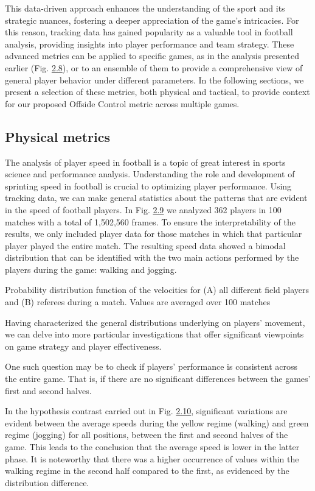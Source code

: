 \documentclass[twoside,nohyper]{tufte-book}
\begin{document}
This data-driven approach enhances the understanding of the sport and
its strategic nuances, fostering a deeper appreciation of the game's
intricacies. For this reason, tracking data has gained popularity as a
valuable tool in football analysis, providing insights into player
performance and team strategy. These advanced metrics can be applied to
specific games, as in the analysis presented earlier (Fig.
\protect\hyperlink{f2.8}{2.8}), or to an ensemble
of them to provide a comprehensive view of general player behavior under
different parameters. In the following sections, we present a selection
of these metrics, both physical and tactical, to provide context for our
proposed Offside Control metric across multiple games.

\hypertarget{physical-metrics-1}{%
\subsection{Physical metrics}\label{physical-metrics-1}}

The analysis of player speed in football is a topic of great interest in
sports science and performance analysis. Understanding the role and
development of sprinting speed in football is crucial to optimizing
player performance. Using tracking data, we can make general statistics
about the patterns that are evident in the speed of football players. In
Fig. \protect\hyperlink{f2.9}{2.9} we analyzed 362
players in 100 matches with a total of 1,502,560 frames. To ensure the
interpretability of the results, we only included player data for those
matches in which that particular player played the entire match. The
resulting speed data showed a bimodal distribution that can be
identified with the two main actions performed by the players during the
game: walking and jogging.

Probability distribution function of the velocities for
(A) all different field players and
(B) referees during a match. Values are averaged over
{100} matches

Having characterized the general distributions underlying on players'
movement, we can delve into more particular investigations that offer
significant viewpoints on game strategy and player effectiveness.

One such question may be to check if players' performance is consistent
across the entire game. That is, if there are no significant differences
between the games' first and second halves.

In the hypothesis contrast carried out in Fig.
\protect\hyperlink{f2.10}{2.10}, significant
variations are evident between the average speeds during the yellow
regime (walking) and green regime (jogging) for all positions, between
the first and second halves of the game. This leads to the conclusion
that the average speed is lower in the latter phase. It is noteworthy
that there was a higher occurrence of values within the walking regime
in the second half compared to the first, as evidenced by the
distribution difference.
\end{document}
